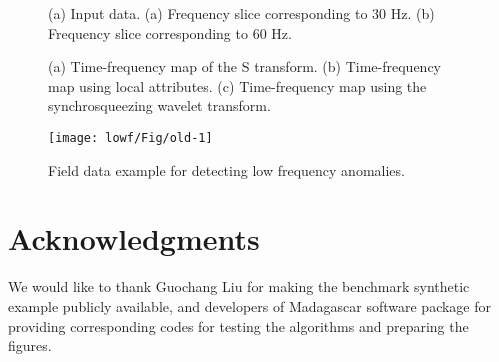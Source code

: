 \begin{figure}[htb!]
  \centering
	\caption{(a) Input data. (a) Frequency slice corresponding to 30 Hz. (b) Frequency slice corresponding to 60 Hz.}
   \label{fig:data,lowf,higf}
\end{figure}

\begin{figure}[htb!]
  \centering
	\caption{(a) Time-frequency map of the S transform. (b) Time-frequency map using local attributes. (c) Time-frequency map using the synchrosqueezing wavelet transform.}
   \label{fig:timefreq-st,timefreq,pp-tfsswt}
\end{figure}

\begin{figure}[htb!]
  \centering
  \texttt{[image: lowf/Fig/old-1]}
	\caption{Field data example for detecting low frequency anomalies.}
   \label{fig:data2}
\end{figure}

\section{Acknowledgments}
We would like to thank Guochang Liu for making the benchmark synthetic example publicly available, and developers of Madagascar software package for providing corresponding codes for testing the algorithms and preparing the figures.

